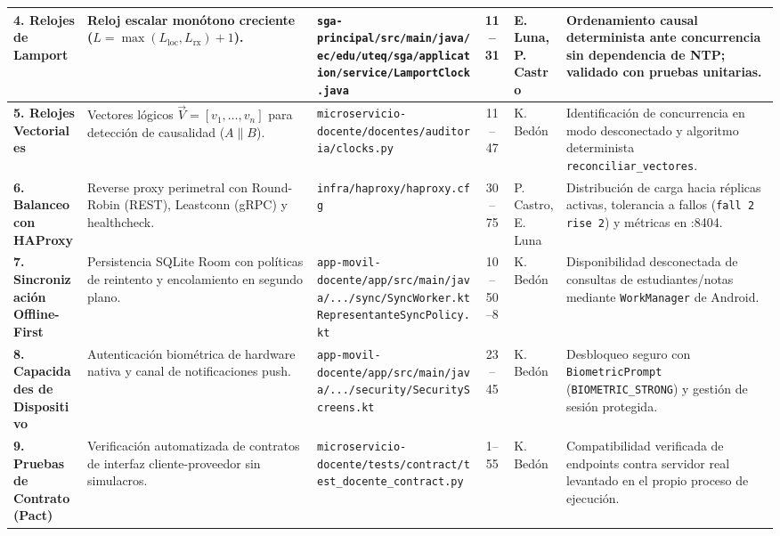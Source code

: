 \documentclass[11pt,a4paper]{article}
\begin{document}
\begin{table}[H]
\begin{tabularx}{\textwidth}{|p{2.2cm}|p{2.5cm}|p{4.8cm}|c|p{1.4cm}|X|}
\hline
\textbf{4. Relojes de Lamport} &
Reloj escalar mon\'otono creciente ($L = \max(L_{\text{loc}}, L_{\text{rx}}) + 1$). &
\texttt{sga-principal/src/main/java/}\allowbreak\texttt{ec/edu/uteq/sga/application/}\allowbreak\texttt{service/LamportClock.java} &
11--31 &
E. Luna, \newline P. Castro &
Ordenamiento causal determinista ante concurrencia sin dependencia de NTP; validado con pruebas unitarias. \\
\hline
\textbf{5. Relojes Vectoriales} &
Vectores l\'ogicos $\vec{V} = [v_1, \dots, v_n]$ para detecci\'on de causalidad ($A \parallel B$). &
\texttt{microservicio-docente/docentes/}\allowbreak\texttt{auditoria/clocks.py} &
11--47 &
K. Bed\'on &
Identificaci\'on de concurrencia en modo desconectado y algoritmo determinista \texttt{reconciliar\_vectores}. \\
\hline
\textbf{6. Balanceo con HAProxy} &
Reverse proxy perimetral con Round-Robin (REST), Leastconn (gRPC) y healthcheck. &
\texttt{infra/haproxy/haproxy.cfg} &
30--75 &
P. Castro, \newline E. Luna &
Distribuci\'on de carga hacia r\'eplicas activas, tolerancia a fallos (\texttt{fall 2 rise 2}) y m\'etricas en :8404. \\
\hline
\textbf{7. Sincronizaci\'on Offline-First} &
Persistencia SQLite Room con pol\'iticas de reintento y encolamiento en segundo plano. &
\texttt{app-movil-docente/app/src/main/}\allowbreak\texttt{java/.../sync/SyncWorker.kt} \newline
\texttt{RepresentanteSyncPolicy.kt} &
10--50 \newline
1--8 &
K. Bed\'on &
Disponibilidad desconectada de consultas de estudiantes/notas mediante \texttt{WorkManager} de Android. \\
\hline
\textbf{8. Capacidades de Dispositivo} &
Autenticaci\'on biom\'etrica de hardware nativa y canal de notificaciones push. &
\texttt{app-movil-docente/app/src/main/}\allowbreak\texttt{java/.../security/SecurityScreens.kt} &
23--45 &
K. Bed\'on &
Desbloqueo seguro con \texttt{BiometricPrompt} (\texttt{BIOMETRIC\_STRONG}) y gesti\'on de sesi\'on protegida. \\
\hline
\textbf{9. Pruebas de Contrato (Pact)} &
Verificaci\'on automatizada de contratos de interfaz cliente-proveedor sin simulacros. &
\texttt{microservicio-docente/tests/}\allowbreak\texttt{contract/test\_docente\_contract.py} &
1--55 &
K. Bed\'on &
Compatibilidad verificada de endpoints contra servidor real levantado en el propio proceso de ejecuci\'on. \\
\hline
\end{tabularx}
\end{table}
\end{document}

